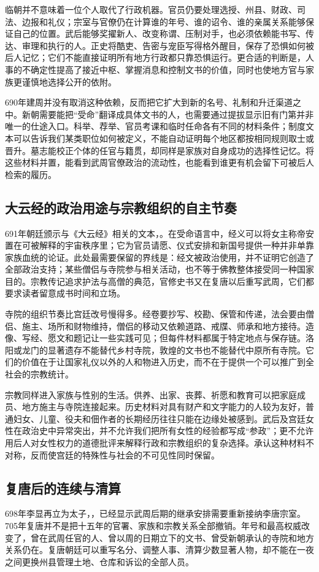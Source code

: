 临朝并不意味着一位个人取代了行政机器。官员仍要处理选授、州县、财政、司法、边报和礼仪；宗室与官僚仍在计算谁的年号、谁的诏令、谁的亲属关系能够保证自己的位置。武后能够奖擢新人、改变称谓、压制对手，也必须依赖能书写、传达、审理和执行的人。正史将酷吏、告密与宠臣写得格外醒目，保存了恐惧如何被后人记忆；它们不能直接证明所有地方行政都只靠恐惧运行。更合适的判断是，人事的不确定性提高了接近中枢、掌握消息和控制文书的价值，同时也使地方官与家族更谨慎地选择公开的依附。

690年建周并没有取消这种依赖，反而把它扩大到新的名号、礼制和升迁渠道之中。新朝需要能把“受命”翻译成具体文书的人，也需要通过提拔显示旧有门第并非唯一的仕途入口。科举、荐举、官员考课和临时任命各有不同的材料条件；制度文本可以告诉我们某类职位如何被定义，不能自动证明每个地区都按相同规则取士或晋升。墓志能校正个体的任官与籍贯，却同样是家族对自身成功的选择性记忆。将这些材料并置，能看到武周官僚政治的流动性，也能看到谁更有机会留下可被后人检索的履历。

\subsection{大云经的政治用途与宗教组织的自主节奏}
691年朝廷颁示与《大云经》相关的文本，。在受命语言中，经义可以将女主称帝安置在可被解释的宇宙秩序里；它为官员请愿、仪式安排和新国号提供一种并非单靠家族血统的论证。此处最需要保留的界线是：经文被政治使用，并不证明它创造了全部政治支持；某些僧侣与寺院参与相关活动，也不等于佛教整体接受同一种国家目的。宗教传记追求护法与高僧的典范，官修史书又在复唐以后重写武周，它们都要求读者留意成书时间和立场。

寺院的组织节奏比宫廷改号慢得多。经卷要抄写、校勘、保管和传递，法会要由僧侣、施主、场所和财物维持，僧侣的移动又依赖道路、戒牒、师承和地方接待。造像、写经、愿文和题记让一些实践可见；但每件材料都属于特定地点与保存链。洛阳或龙门的显著遗存不能替代乡村寺院，敦煌的文书也不能替代中原所有寺院。它们的价值在于让国家礼仪以外的人和物进入历史，而不在于提供一个可以推广到全社会的宗教统计。

宗教同样进入家族与性别的生活。供养、出家、丧葬、祈愿和教育可以把家庭成员、地方施主与寺院连接起来。历史材料对具有财产和文字能力的人较为友好，普通妇女、儿童、役夫和佃作者的长期经历往往只能在边缘处被感到。武后及宫廷女性在政治史中异常突出，并不允许我们把所有女性的经验都写成“参政”；更不允许用后人对女性权力的道德批评来解释行政和宗教组织的复杂选择。承认这种材料不对称，反而使宫廷的特殊性与社会的不可见性同时保留。

\subsection{复唐后的连续与清算}
698年李显再立为太子，，已经显示武周后期的继承安排需要重新接纳李唐宗室。705年复唐并不是把十五年的官署、家族和宗教关系全部撤销。年号和最高权威改变了，曾在武周任官的人、曾以周的日期立下的文书、曾受新朝承认的寺院和地方关系仍在。复唐朝廷可以重写名分、调整人事、清算少数显著人物，却不能在一夜之间更换州县管理土地、仓库和诉讼的全部人员。


